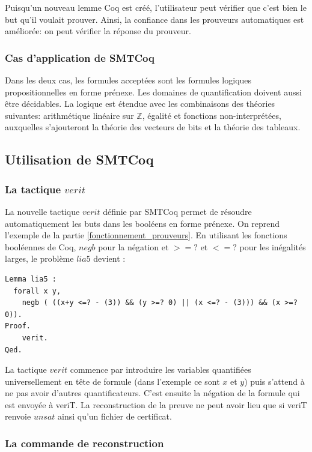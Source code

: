\documentclass[11pt]{article}
\begin{document}
Puisqu'un nouveau lemme Coq est créé, l'utilisateur peut vérifier que c'est bien le but qu'il voulait prouver. Ainsi, la confiance dans les prouveurs automatiques est améliorée: on peut vérifier la réponse du prouveur.


\subsubsection{Cas d'application de SMTCoq}

Dans les deux cas, les formules acceptées sont les formules logiques propositionnelles en forme prénexe. Les domaines de quantification doivent aussi être décidables. La logique est étendue avec les combinaisons des théories suivantes: arithmétique linéaire sur $\mathbb{Z}$, égalité et fonctions non-interprétées, auxquelles s'ajouteront la théorie des vecteurs de bits et la théorie des tableaux. 

\subsection{Utilisation de SMTCoq}

\subsubsection{La tactique $verit$}

La nouvelle tactique $verit$ définie par SMTCoq permet de résoudre automatiquement les buts dans les booléens en forme prénexe. On reprend l'exemple de la partie \ref{fonctionnement_prouveurs}. En utilisant les fonctions booléennes de Coq, $negb$ pour la négation et $>=?$ et $<=?$ pour les inégalités larges, le problème $lia5$ devient :

\begin{lstlisting}[frame=single]
Lemma lia5 : 
  forall x y,
    negb ( ((x+y <=? - (3)) && (y >=? 0) || (x <=? - (3))) && (x >=? 0)).
Proof.
    verit.
Qed.
\end{lstlisting}

La tactique $verit$ commence par introduire les variables quantifiées universellement en tête de formule (dans l'exemple ce sont $x$ et $y$) puis s'attend à ne pas avoir d'autres quantificateurs. C'est ensuite la négation de la formule qui est envoyée à veriT. La reconstruction de la preuve ne peut avoir lieu que si veriT renvoie $unsat$ ainsi qu'un fichier de certificat.

\subsubsection{La commande de reconstruction}
\end{document}
